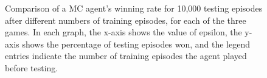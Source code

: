 \documentclass[11pt,a4paper]{report}
\begin{document}
\begin{figure}[htbp]
    \centering
    \caption{Comparison of a MC agent's winning rate for 10,000 testing episodes after different numbers of training episodes, for each of the three games. In each graph, the x-axis shows the value of epsilon, the y-axis shows the percentage of testing episodes won, and the legend entries indicate the number of training episodes the agent played before testing.}
    \label{epsilon-win-comparisons}
\end{figure}
\end{document}
